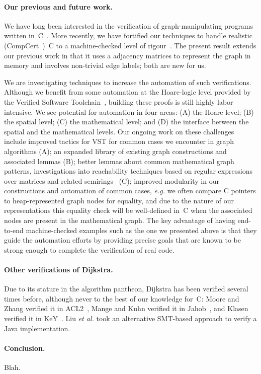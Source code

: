 \paragraph{Our previous and future work.} We have long been interested in
the verification of graph-manipulating programs written in~C~\cite{hobor:ramification}.
More recently, we have fortified our techniques to handle realistic (CompCert~\cite{leroy:compcert})~C
to a machine-checked level of rigour~\cite{DBLP:journals/pacmpl/WangCMH19}.  The present result extends
our previous work in that it uses a adjacency matrices to represent the graph in
memory and involves non-trivial edge labels; both are new for us.

We are investigating techniques to increase the automation of such verifications.  Although
we benefit from some automation at the Hoare-logic level provided by the Verified Software
Toolchain~\cite{appel:programlogics}, building these proofs is still highly labor intensive.  We see potential
for automation in four areas: (A) the Hoare level; (B) the spatial level; (C) the mathematical level; and (D) the interface between the spatial and the mathematical levels.  Our ongoing work
on these challenges include improved tactics for VST for common cases we encounter in graph
algorithms (A); an expanded library of existing graph constructions and associated lemmas (B);
better lemmas about common mathematical graph patterns, investigations into reachability techniques
based on regular expressions over matrices and related semirings~\cite{backhouse,DBLP:journals/jacm/Tarjan81a,dolan2013fun,krishna2017go} (C); improved modularity in our constructions and
automation of common cases, \emph{e.g.} we often compare C pointers to heap-represented graph
nodes for equality, and due to the nature of our representations this equality check will be
well-defined in~C when the associated nodes are present in the mathematical graph.  The key
advantage of having end-to-end machine-checked examples such as the one we presented above is 
that they guide the automation efforts by providing precise goals that are known to be strong 
enough to complete the verification of real code.

\paragraph{Other verifications of Dijkstra.}
Due to its stature in the algorithm pantheon, Dijkstra has been verified several times before, although never to the best of our knowledge for~C: Moore and Zhang verified it in ACL2~\cite{Moore2005}, Mange and Kuhn verified it in Jahob~\cite{mange2007verifying}, and Klasen verified it in KeY~\cite{klasen2010verifying}.  Liu \emph{et al.} took an alternative SMT-based approach to verify a Java implementation.

\paragraph{Conclusion.}
Blah.
